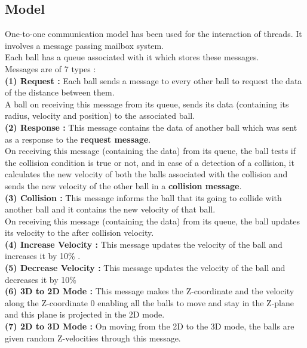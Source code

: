 \documentclass[a4paper]{article}
\begin{document}
\subsection{Model}
One-to-one communication model has been used for the interaction of threads. It involves a message passing mailbox system. \\
Each ball has a queue associated with it which stores these messages.
\\Messages are of 7 types : \\
\textbf{(1) Request : }Each ball sends a message to every other ball to request the data of the distance between them. \\
A ball on receiving this message from its queue,  sends its data (containing its radius, velocity and position) to the associated ball.\\
\textbf{(2) Response : }This message contains the data of another ball which was sent as a response to the \textbf{request message}. \\
On receiving this message (containing the data) from its queue, the ball tests if the collision condition is true or not, and in case of a detection of a collision, it calculates the new velocity of both the balls associated with the collision and sends the new velocity of the other ball in a \textbf{collision message}. \\
\textbf{(3) Collision : }This message informs the ball that its going to collide with another ball and it contains the new velocity of that ball.\\
On receiving this message (containing the data) from its queue, the ball updates its velocity to the after collision velocity.\\
\textbf{(4) Increase Velocity : }This message  updates the velocity of the ball and increases it by 10\% .  \\
\textbf{(5) Decrease Velocity : }This message  updates the velocity of the ball and decreases it by 10\% \\
\textbf{(6) 3D to 2D  Mode : }This message makes the Z-coordinate and the velocity along the Z-coordinate 0 enabling all the balls to move and stay in the Z-plane and this plane is projected in the 2D mode. \\
\textbf{(7) 2D to 3D  Mode : }On moving from the 2D to the 3D mode, the balls are given random Z-velocities through this message.\\
\end{document}
